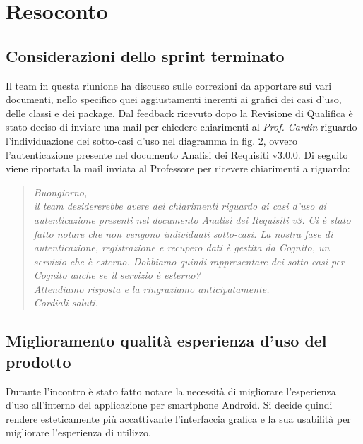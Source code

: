\clearpage
\section{Resoconto}
	\subsection{Considerazioni dello sprint terminato}
	\label{sec:considerazioni}
	Il team in questa riunione ha discusso sulle correzioni da apportare sui vari documenti, nello specifico quei aggiustamenti inerenti ai grafici dei casi d'uso, delle classi e dei package. Dal feedback ricevuto dopo la Revisione di Qualifica è stato deciso di inviare una mail per chiedere chiarimenti al \textit{Prof. Cardin} riguardo l'individuazione dei sotto-casi d'uso nel diagramma in fig. 2, ovvero l'autenticazione presente nel documento Analisi dei Requisiti v3.0.0. Di seguito viene riportata la mail inviata al Professore per ricevere chiarimenti a riguardo:
	\begin{quote}
		\emph{Buongiorno,\\[0.25cm]il team desidererebbe avere dei chiarimenti riguardo ai casi d’uso di autenticazione presenti nel documento Analisi dei Requisiti v3. Ci è stato fatto notare che non vengono individuati sotto-casi. La nostra fase di autenticazione, registrazione e recupero dati è gestita da Cognito, un servizio che è esterno. Dobbiamo quindi rappresentare dei sotto-casi per Cognito anche se il servizio è esterno?\\[0.25cm]Attendiamo risposta e la ringraziamo anticipatamente.\\Cordiali saluti.
		}
	\end{quote}
	\subsection{Miglioramento qualità esperienza d'uso del prodotto}
	\label{sec:migliorie}
	Durante l'incontro è stato fatto notare la necessità di migliorare l'esperienza d'uso all'interno del applicazione per smartphone Android. Si decide quindi rendere esteticamente più accattivante l'interfaccia grafica e la sua usabilità per migliorare l'esperienza di utilizzo. 
